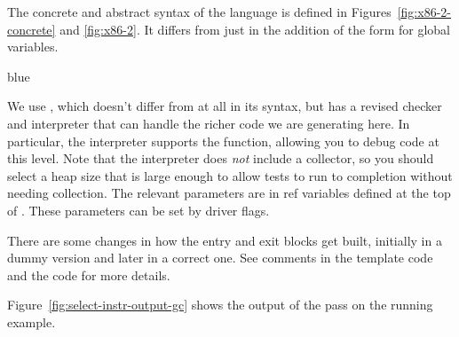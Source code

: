 \documentclass[11pt]{book}
\newenvironment{ocamlx}{
  \begin{color}{blue}
}
{
  \end{color}
}
\begin{document}
The concrete and abstract syntax of the \LangXGlobal{} language is
defined in Figures~\ref{fig:x86-2-concrete} and \ref{fig:x86-2}.  It
differs from \LangXIf{} just in the addition of the form for global
variables.
\begin{ocamlx}
We use \LangXAlloc{}, which doesn't differ from \LangXIf{} at all in
  its syntax, but has a revised checker and interpreter that can handle the
  richer code we are generating here.  In particular, the interpreter supports
  the  function, allowing you to debug code at this level. Note
  that the interpreter does \emph{not} include a collector, so you should
  select a heap size that is large enough to allow tests to run to completion
  without needing collection.  The relevant parameters are in
  ref variables defined at the top of .  These parameters
  can be set by driver flags. 

  There are some changes in how the entry and exit blocks get built, initially in
  a dummy version and later in a correct one.  See comments in the 
  template code and the  code for more details.
\end{ocamlx}


%
Figure~\ref{fig:select-instr-output-gc} shows the output of the
 pass on the running example.
\end{document}
